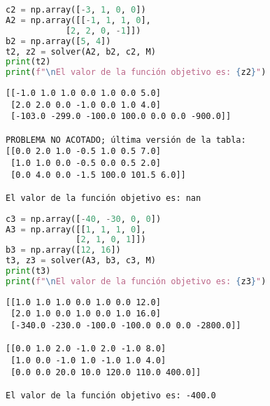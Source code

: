\begin{lstlisting}[language=Python]
c2 = np.array([-3, 1, 0, 0])
A2 = np.array([[-1, 1, 1, 0],
            [2, 2, 0, -1]])
b2 = np.array([5, 4])
t2, z2 = solver(A2, b2, c2, M)
print(t2)
print(f"\nEl valor de la función objetivo es: {z2}")
\end{lstlisting}

\begin{lstlisting}
[[-1.0 1.0 1.0 0.0 1.0 0.0 5.0]
 [2.0 2.0 0.0 -1.0 0.0 1.0 4.0]
 [-103.0 -299.0 -100.0 100.0 0.0 0.0 -900.0]]

PROBLEMA NO ACOTADO; última versión de la tabla:
[[0.0 2.0 1.0 -0.5 1.0 0.5 7.0]
 [1.0 1.0 0.0 -0.5 0.0 0.5 2.0]
 [0.0 4.0 0.0 -1.5 100.0 101.5 6.0]]

El valor de la función objetivo es: nan
\end{lstlisting}

\begin{lstlisting}[language=Python]
c3 = np.array([-40, -30, 0, 0])
A3 = np.array([[1, 1, 1, 0],
              [2, 1, 0, 1]])
b3 = np.array([12, 16])
t3, z3 = solver(A3, b3, c3, M)
print(t3)
print(f"\nEl valor de la función objetivo es: {z3}")
\end{lstlisting}

\begin{lstlisting}
[[1.0 1.0 1.0 0.0 1.0 0.0 12.0]
 [2.0 1.0 0.0 1.0 0.0 1.0 16.0]
 [-340.0 -230.0 -100.0 -100.0 0.0 0.0 -2800.0]]

[[0.0 1.0 2.0 -1.0 2.0 -1.0 8.0]
 [1.0 0.0 -1.0 1.0 -1.0 1.0 4.0]
 [0.0 0.0 20.0 10.0 120.0 110.0 400.0]]

El valor de la función objetivo es: -400.0
\end{lstlisting}

\begin{lstlisting}[language=Python]
\end{lstlisting}
